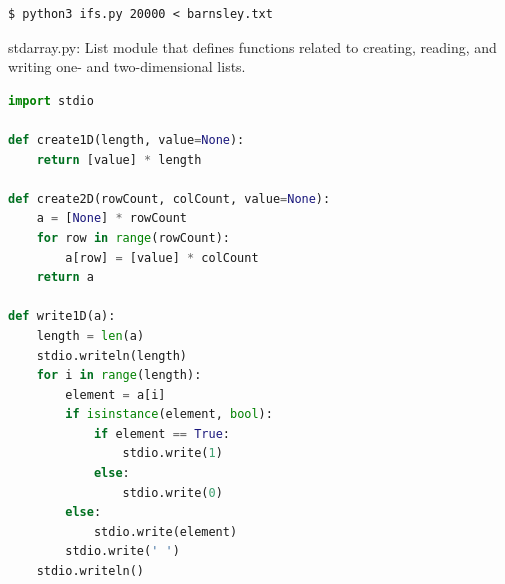 \documentclass[8pt,a4paper,compress]{beamer}
\begin{document}
\begin{frame}[fragile]
\begin{minipage}{160pt}
\begin{lstlisting}[language={},style=focusin]
$ python3 ifs.py 20000 < barnsley.txt
\end{lstlisting}
\end{minipage}%
\begin{minipage}{140pt}
\begin{center}
\hfill {}
\end{center}
\end{minipage}
\end{frame}

\begin{frame}[fragile]
\pause

\begin{framed}
\tiny stdarray.py: List module that defines functions related to creating, reading, and writing one- and two-dimensional lists.
\end{framed}

\begin{lstlisting}[language=Python,style=focusin]
import stdio

def create1D(length, value=None):
    return [value] * length

def create2D(rowCount, colCount, value=None):
    a = [None] * rowCount
    for row in range(rowCount):
        a[row] = [value] * colCount
    return a

def write1D(a):
    length = len(a)
    stdio.writeln(length)
    for i in range(length):
        element = a[i]
        if isinstance(element, bool):
            if element == True:
                stdio.write(1)
            else:
                stdio.write(0) 
        else:
            stdio.write(element)
        stdio.write(' ')
    stdio.writeln()
\end{lstlisting}
\end{frame}
\end{document}
